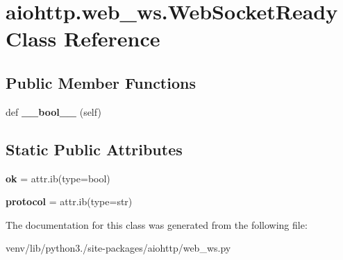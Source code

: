\hypertarget{classaiohttp_1_1web__ws_1_1_web_socket_ready}{}\section{aiohttp.\+web\+\_\+ws.\+Web\+Socket\+Ready Class Reference}
\label{classaiohttp_1_1web__ws_1_1_web_socket_ready}
\subsection*{Public Member Functions}
\begin{DoxyCompactItemize}
\item 
\mbox{\label{classaiohttp_1_1web__ws_1_1_web_socket_ready_aec375fa7b41a68085e43bbe6a501672f}} 
def {\bfseries \+\_\+\+\_\+bool\+\_\+\+\_\+} (self)
\end{DoxyCompactItemize}
\subsection*{Static Public Attributes}
\begin{DoxyCompactItemize}
\item 
\mbox{\label{classaiohttp_1_1web__ws_1_1_web_socket_ready_a77d45425afa78797094202ebb0e4f2be}} 
{\bfseries ok} = attr.\+ib(type=bool)
\item 
\mbox{\label{classaiohttp_1_1web__ws_1_1_web_socket_ready_a7b9c3c0c2c5244555b4c2ea6a5d8e7d5}} 
{\bfseries protocol} = attr.\+ib(type=str)
\end{DoxyCompactItemize}


The documentation for this class was generated from the following file\+:\begin{DoxyCompactItemize}
\item 
venv/lib/python3./site-\/packages/aiohttp/web\+\_\+ws.\+py\end{DoxyCompactItemize}

